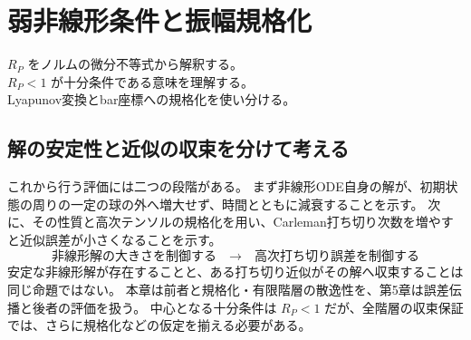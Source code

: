 \chapter{弱非線形条件と振幅規格化}
\begin{chaptergoal}
\cgitem $R_P$ をノルムの微分不等式から解釈する。\\
\cgitem $R_P<1$ が十分条件である意味を理解する。\\
\cgitem Lyapunov変換とbar座標への規格化を使い分ける。
\end{chaptergoal}

\section{解の安定性と近似の収束を分けて考える}
これから行う評価には二つの段階がある。
まず非線形ODE自身の解が、初期状態の周りの一定の球の外へ増大せず、時間とともに減衰することを示す。
次に、その性質と高次テンソルの規格化を用い、Carleman打ち切り次数を増やすと近似誤差が小さくなることを示す。
\[
\boxed{\text{非線形解の大きさを制御する}}
\quad\longrightarrow\quad
\boxed{\text{高次打ち切り誤差を制御する}}
\]
安定な非線形解が存在することと、ある打ち切り近似がその解へ収束することは同じ命題ではない。
本章は前者と規格化・有限階層の散逸性を、第5章は誤差伝播と後者の評価を扱う。
中心となる十分条件は $R_P<1$ だが、全階層の収束保証では、さらに規格化などの仮定を揃える必要がある。

